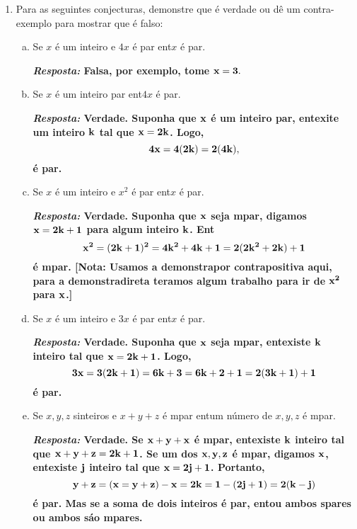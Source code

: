 \begin{enumerate}[{\bf 1.}]
\begin{enumerate}[a)]
{\noindent \underline{Indireta}: Suponha que ${\bf x}$ seja par, que ${\bf y}$ seja \ih mpar e que ${\bf x+y}$ seja par. Ent\ao esxistem inteiros ${\bf j,k}$ tais que ${\bf y=2j+1}$ e ${\bf x+y=2k}$. Logo,
\[
{\bf x=x+y-y=2j+1-2k=2(j-k)+1}
\]
\'e \ih mpar, contradizendo o fata que ${\bf x}$ \'e par, por hip\'otese.}

\item Se $x$ e $y$ s\ao inteiros \ih mpares ent\ao $xy$ \'e um inteiro \ih mpar.
\end{enumerate}

\item Para as seguintes conjecturas, demonstre que \'e verdade ou d\^e um contra-exemplo para mostrar que \'e falso: 
\begin{enumerate}[a)]
\item Se $x$ \'e um inteiro e $4x$ \'e par ent\ao $x$ \'e par. 

{\bf{\it Resposta:} Falsa, por exemplo, tome ${\bf x=3}.$}

\item Se $x$ \'e um inteiro par ent\ao $4x$ \'e par.

{\bf{\it Resposta:} Verdade. Suponha que ${\bf x}$ \'e um inteiro par, ent\ao exite um inteiro ${\bf k}$ tal que ${\bf x=2k}$. Logo,
\[
{\bf 4x=4(2k)=2(4k),}
\]
\'e par.}

\item Se $x$ \'e um inteiro e $x^2$ \'e par ent\ao $x$ \'e par.

{\bf{\it Resposta:} Verdade. Suponha que ${\bf x}$ seja \ih mpar, digamos ${\bf x=2k+1}$ para algum inteiro ${\bf k}$. Ent\ao 
\[
{\bf x^2=(2k+1)^2=4k^2+4k+1=2(2k^2+2k)+1}
\] 
\'e \ih mpar. [Nota: Usamos a demonstra\cao por contrapositiva aqui, para a demonstra\cao direta ter\ih amos algum trabalho para ir de ${\bf x^2}$ para ${\bf x}$.]}

\item Se $x$ \'e um inteiro e $3x$ \'e par ent\ao $x$ \'e par.

{\bf{\it Resposta:} Verdade. Suponha que ${\bf x}$ seja \ih mpar, ent\ao existe ${\bf k}$ inteiro tal que ${\bf x=2k+1}$. Logo,
\[
{\bf 3x=3(2k+1)=6k+3=6k+2+1=2(3k+1)+1}
\]
\'e \ih par.}

\item Se $x,y,z$ s\ao inteiros e $x+y+z$ \'e \ih mpar ent\ao um n\'umero de $x,y,z$ \'e \ih mpar.

{\bf{\it Resposta:} Verdade. Se ${\bf x+y+x}$ \'e \ih mpar, ent\ao existe ${\bf k}$ inteiro tal que ${\bf x+y+z=2k+1}$. Se um dos ${\bf x,y,z}$ \'e \ih mpar, digamos ${\bf x}$, ent\ao existe ${\bf j}$ inteiro tal que ${\bf x=2j+1}$. Portanto,
\[
{\bf y+z=(x=y+z)-x=2k=1-(2j+1)=2(k-j)}
\]
\'e par. Mas se a soma de dois inteiros \'e par, ent\ao ou ambos s\ao pares ou ambos s\'ao \ih mpares.}
\end{enumerate}


\end{enumerate}
